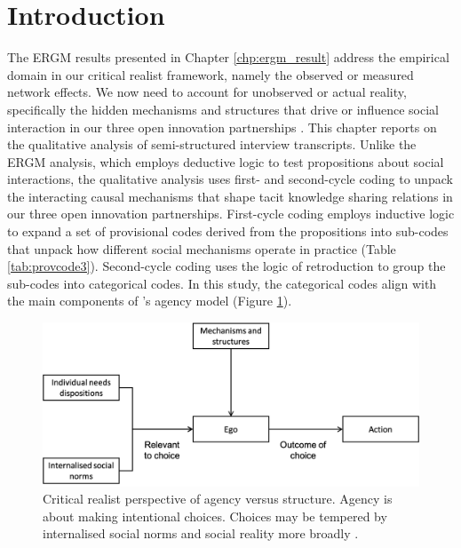 \section{Introduction}

The ERGM results presented in Chapter \ref{chp:ergm_result} address the empirical domain in our critical realist framework, namely the observed or measured network effects. We now need to account for unobserved or actual reality, specifically the hidden mechanisms and structures that drive or influence social interaction in our three open innovation partnerships \citep{welch2011theorising, mcavoy2018critical, haigh2019developing}. This chapter reports on the qualitative analysis of semi-structured interview transcripts. Unlike the ERGM analysis, which employs deductive logic to test propositions about social interactions, the qualitative analysis uses first- and second-cycle coding to unpack the interacting causal mechanisms that shape tacit knowledge sharing relations in our three open innovation partnerships. First-cycle coding employs inductive logic to expand a set of provisional codes derived from the propositions into sub-codes that unpack how different social mechanisms operate in practice (Table \ref{tab:provcode3}). Second-cycle coding uses the logic of retroduction to group the sub-codes into categorical codes. In this study, the categorical codes align with the main components of \citeauthor{loyal2001agency}'s \citeyearpar{loyal2001agency} agency model (Figure \ref{fig:agency_structure3}). \medskip

\begin{figure}[h]
    \centering
    \includegraphics[width = \textwidth]{Images/agency_structure_loyal.png}
    \caption[]{Critical realist perspective of agency versus structure. Agency is about making intentional choices. Choices may be tempered by internalised social norms and social reality more broadly \citep{loyal2001agency}.}
    \label{fig:agency_structure3}
\end{figure}

